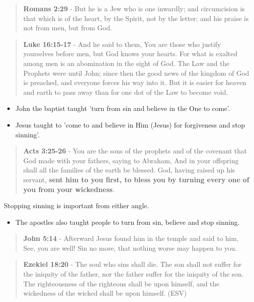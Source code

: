 \documentclass[11pt]{article}
\begin{document}
\begin{quote}
\textbf{Romans 2:29} - But he is a Jew who is one inwardly; and circumcision is that which is of the heart, by the Spirit, not by the letter; and his praise is not from men, but from God.
\end{quote}

\begin{quote}
\textbf{Luke 16:15-17} - And he said to them, You are those who justify yourselves before men, but God knows your hearts. For what is exalted among men is an abomination in the sight of God.  The Law and the Prophets were until John; since then the good news of the kingdom of God is preached, and everyone forces his way into it.  But it is easier for heaven and earth to pass away than for one dot of the Law to become void.
\end{quote}

\begin{itemize}
\item John the baptist taught 'turn from sin and believe in the One to come'.
\item Jesus taught to 'come to and believe in Him (Jesus) for forgiveness and stop sinning'.
\end{itemize}

\begin{quote}
\textbf{Acts 3:25-26} - You are the sons of the prophets and of the covenant that God made with your fathers, saying to Abraham, And in your offspring shall all the families of the earth be blessed. God, having raised up his servant, \textbf{sent him to you first, to bless you by turning every one of you from your wickedness}.
\end{quote}

Stopping sinning is important from either angle.

\begin{itemize}
\item The apostles also taught people to turn from sin, believe and stop sinning.
\end{itemize}

\begin{quote}
\textbf{John 5:14} - Afterward Jesus found him in the temple and said to him, See, you are well! Sin no more, that nothing worse may happen to you.
\end{quote}

\begin{quote}
\textbf{Ezekiel 18:20} - The soul who sins shall die. The son shall not suffer for the iniquity of the father, nor the father suffer for the iniquity of the son. The righteousness of the righteous shall be upon himself, and the wickedness of the wicked shall be upon himself. (ESV)
\end{quote}
\end{document}
